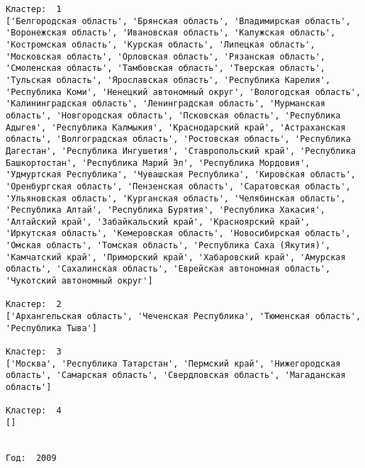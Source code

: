 \documentclass[11pt]{article}
\begin{document}
\begin{Verbatim}[commandchars=\\\{\}]
Кластер:  1
['Белгородская область', 'Брянская область', 'Владимирская область', 'Воронежская область', 'Ивановская область', 'Калужская область', 'Костромская область', 'Курская область', 'Липецкая область', 'Московская область', 'Орловская область', 'Рязанская область', 'Смоленская область', 'Тамбовская область', 'Тверская область', 'Тульская область', 'Ярославская область', 'Республика Карелия', 'Республика Коми', 'Ненецкий автономный округ', 'Вологодская область', 'Калинингpадская область', 'Ленинградская область', 'Мурманская область', 'Новгородская область', 'Псковская область', 'Республика Адыгея', 'Республика Калмыкия', 'Краснодарский край', 'Астраханская область', 'Волгоградская область', 'Ростовская область', 'Республика Дагестан', 'Республика Ингушетия', 'Ставропольский край', 'Республика Башкортостан', 'Республика Марий Эл', 'Республика Мордовия', 'Удмуртская Республика', 'Чувашская Республика', 'Кировская область', 'Оренбургская область', 'Пензенская область', 'Саратовская область', 'Ульяновская область', 'Курганская область', 'Челябинская область', 'Республика Алтай', 'Республика Бурятия', 'Республика Хакасия', 'Алтайский край', 'Забайкальский край', 'Красноярский край', 'Иркутская область', 'Кемеровская область', 'Новосибирская область', 'Омская область', 'Томская область', 'Республика Саха (Якутия)', 'Камчатский край', 'Приморский край', 'Хабаровский край', 'Амурская область', 'Сахалинская область', 'Еврейская автономная область', 'Чукотский автономный округ']

Кластер:  2
['Архангельская область', 'Чеченская Республика', 'Тюменская область', 'Республика Тыва']

Кластер:  3
['Москва', 'Республика Татарстан', 'Пермский край', 'Нижегородская область', 'Самарская область', 'Свердловская область', 'Магаданская область']

Кластер:  4
[]


Год:  2009


\end{Verbatim}
\end{document}
